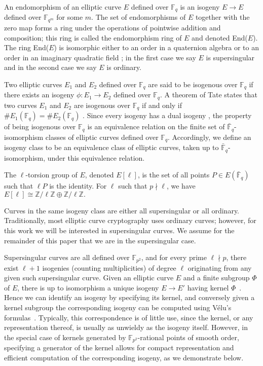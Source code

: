 \documentclass[envcountsect,envcountsame,runningheads]{llncs}   %
\newcommand{\ZZ}{{\mathbb{Z}}}
\newcommand{\FF}{{\mathbb{F}}}
\begin{document}
An endomorphism of an elliptic curve $E$ defined over $\FF_q$ is an
isogeny $E \rightarrow E$ defined over $\FF_{q^m}$ for some $m$. The
set of endomorphisms of $E$ together with the zero map forms a ring
under the operations of pointwise addition and composition; this ring
is called the endomorphism ring of $E$ and denoted End($E$). The ring
End($E$) is isomorphic either to an order in a quaternion algebra or
to an order in an imaginary quadratic field \cite[V.3.1]{Sil}; in the
first case we say $E$ is supersingular and in the second case we say
$E$ is ordinary.

Two elliptic curves $E_1$ and $E_2$ defined over $\FF_q$ are said to
be isogenous over $\FF_q$ if there exists an isogeny $\phi\colon E_1
\to E_2$ defined over $\FF_q$. A theorem of Tate states that
two curves $E_1$ and $E_2$ are isogenous over $\FF_q$ if and only if
$\#E_1(\FF_q) = \#E_2(\FF_q)$ \cite[$\S$3]{Tate}. Since every isogeny
has a dual isogeny \cite[III.6.1]{Sil}, the property of being
isogenous over $\FF_q$ is an equivalence relation on the finite set of
$\bar{\FF}_q$-isomorphism classes of elliptic curves defined over
$\FF_q$.  Accordingly, we define an isogeny class to be an equivalence
class of elliptic curves, taken up to $\bar{\FF}_q$-isomorphism, under
this equivalence relation.

The $\ell$-torsion group of $E$, denoted $E[\ell]$, is the set of all
points $P \in E(\bar{\FF}_q)$ such that $\ell P$ is the identity. For
$\ell$ such that $p\nmid \ell$, we have $E[\ell] \cong \ZZ/\ell\ZZ \oplus
\ZZ/\ell\ZZ.$

Curves in the same isogeny class are either all supersingular or all
ordinary. Traditionally, most elliptic curve cryptography uses
ordinary curves; however, for this work we will be interested in
supersingular curves. We assume for the remainder of this paper that
we are in the supersingular case.

Supersingular curves are all defined over $\FF_{p^2}$, and for every
prime $\ell \nmid p$, there exist $\ell+1$ isogenies (counting
multiplicities) of degree $\ell$ originating from any given such
supersingular curve.
Given an elliptic curve $E$ and a finite subgroup $\Phi$ of $E$, there
is up to isomorphism a unique isogeny $E \to E'$ having kernel
$\Phi$~\cite[III.4.12]{Sil}. Hence we can identify an isogeny by
specifying its kernel, and conversely given a kernel subgroup the
corresponding isogeny can be computed using V\'elu's
formulas~\cite{Velu}. Typically, this correspondence is of little use,
since the kernel, or any representation thereof, is usually as
unwieldy as the isogeny itself. However, in the special case of
kernels generated by $\FF_{p^2}$-rational points of smooth order,
specifying a generator of the kernel allows for compact representation
and efficient computation of the corresponding isogeny, as we
demonstrate below.
\end{document}
